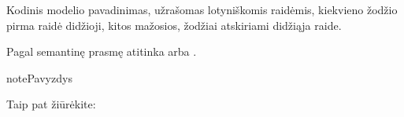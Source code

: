 \documentclass[letterpaper,10pt,lithuanian]{sphinxmanual}
\begin{document}

\begin{fulllineitems}
\label{\detokenize{formatas:model}}
\pysigstartsignatures
\pysigline
{}
\pysigstopsignatures
\sphinxAtStartPar
{}

\sphinxAtStartPar
Kodinis modelio pavadinimas, užrašomas lotyniškomis raidėmis, kiekvieno
žodžio pirma raidė didžioji, kitos mažosios, žodžiai atskiriami didžiąja
raide.

\sphinxAtStartPar
Pagal semantinę prasmę atitinka  arba .

\begin{sphinxadmonition}{note}{Pavyzdys}

\begin{DUlineblock}{0em}
\item[] 
\item[] 
\end{DUlineblock}
\end{sphinxadmonition}


\begin{sphinxseealso}{Taip pat žiūrėkite:}

\begin{DUlineblock}{0em}
\item[] {\hyperref[\detokenize{dimensijos:model}]{}}
\item[] {\hyperref[\detokenize{modelis:modelis}]{}}
\end{DUlineblock}


\end{sphinxseealso}


\end{fulllineitems}

\end{document}
